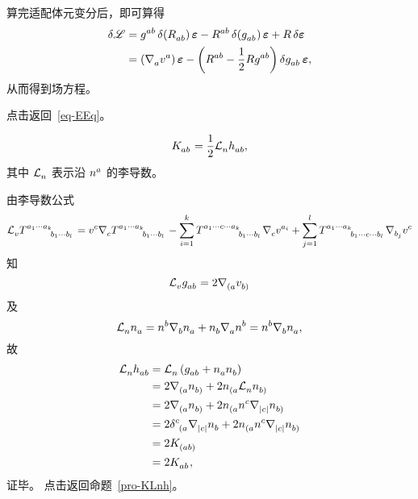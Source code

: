 \begin{Remark}
\begin{enumerate}
				算完适配体元变分后，即可算得
				\begin{equation}
					\begin{split}
						\var{\La} &= \tensor{g}{^a^b} \var(\tensor{R}{_a_b}) \form{\vol} - \tensor{R}{^a^b} \var(\tensor{g}{_a_b}) \form{\vol} + R \var{\form{\vol}}\\
						&= \left( \Nabla{a} \tensor{v}{^a} \right) \form{\vol} - \left( \tensor{R}{^a^b} - \frac{1}{2} R \tensor{g}{^a^b} \right) \var{\tensor{g}{_a_b}} \form{\vol},
					\end{split}
				\end{equation}
				从而得到场方程。
			\end{enumerate}
			{\normalfont\ttfamily\color{green} 点击返回~\eqref{eq-EEq}。}
		\end{Remark}

		\begin{Property}
			\begin{equation}
				\tensor{K}{_a_b} = \frac{1}{2} \Ld{n} \tensor{h}{_a_b},
			\end{equation}
			其中 $\Ld{n}$ 表示沿 $\tensor{n}{^a}$ 的李导数。
		\end{Property}
		\begin{Proof}
			\label{prf-KLnh}
			由李导数公式
			\begin{equation}
				\Ld{v} \tensor{T}{^{a_1 \cdots a_k}_{b_1 \cdots b_l}} = \tensor{v}{^c} \Nabla{c} \tensor{T}{^{a_1 \cdots a_k}_{b_1 \cdots b_l}} - \sum_{i=1}^k \tensor{T}{^{a_1 \cdots c \cdots a_k}_{b_1 \cdots b_l}} \Nabla{c} \tensor{v}{^{a_i}} + \sum_{j=1}^l \tensor{T}{^{a_1 \cdots a_k}_{b_1 \cdots c \cdots b_l}} \Nabla{{b_j}} \tensor{v}{^c}
			\end{equation}
			知
			\begin{equation}
				\Ld{v} \tensor{g}{_a_b} = 2 \Nabla{{(a}} \tensor{v}{_{b)}}
			\end{equation}
			及
			\begin{equation}
				\Ld{n} \tensor{n}{_a} = \tensor{n}{^b} \Nabla{b} \tensor{n}{_a} + \tensor{n}{_b} \Nabla{a} \tensor{n}{^b} = \tensor{n}{^b} \Nabla{b} \tensor{n}{_a},
			\end{equation}
			故
			\begin{equation}
				\begin{split}
					\Ld{n} \tensor{h}{_a_b} &= \Ld{n} \left( \tensor{g}{_a_b} + \tensor{n}{_a} \tensor{n}{_b} \right)\\
					&= 2 \Nabla{{(a}} \tensor{n}{_{b)}} + 2 \tensor{n}{_{(a}} \Ld{n} \tensor{n}{_{b)}}\\
					&= 2 \Nabla{{(a}} \tensor{n}{_{b)}} + 2 \tensor{n}{_{(a}} \tensor{n}{^c} \Nabla{{|c|}} \tensor{n}{_{b)}}\\
					&= 2 \tensor{\delta}{^c_{(a}} \Nabla{{|c|}} \tensor{n}{_b} + 2 \tensor{n}{_{(a}} \tensor{n}{^c} \Nabla{{|c|}} \tensor{n}{_{b)}}\\
					&= 2 \tensor{K}{_{(ab)}}\\
					&= 2 \tensor{K}{_a_b},
				\end{split}
			\end{equation}
			证毕。{\normalfont\ttfamily\color{green} 点击返回命题~\ref{pro-KLnh}。}
		\end{Proof}
